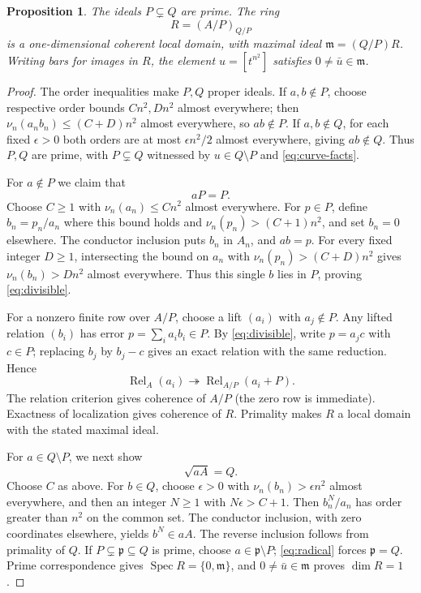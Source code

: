 \documentclass[11pt,reqno]{amsart}
\numberwithin{equation}{section}
\theoremstyle{plain}
\newtheorem{proposition}[theorem]{Proposition}
\DeclareMathOperator{\Spec}{Spec}
\newcommand{\mm}{\mathfrak m}
\begin{document}
\begin{proposition}\label{prop:ring}
The ideals $P\subsetneq Q$ are prime. The ring
\[
 R=(A/P)_{Q/P}
\]
is a one-dimensional coherent local domain, with maximal ideal
$\mm=(Q/P)R$. Writing bars for images in $R$, the element
$u=[t^{n^2}]$ satisfies $0\ne\bar u\in\mm$.
\end{proposition}
\begin{proof}
The order inequalities make $P,Q$ proper ideals. If $a,b\notin P$,
choose respective order bounds $Cn^2,Dn^2$ almost everywhere;
then $\nu_n(a_nb_n)\leq(C+D)n^2$ almost everywhere, so $ab\notin P$.
If $a,b\notin Q$, for each fixed $\epsilon>0$ both orders are at most
$\epsilon n^2/2$ almost everywhere, giving $ab\notin Q$.
Thus $P,Q$ are prime, with $P\subsetneq Q$ witnessed by
$u\in Q\setminus P$ and \eqref{eq:curve-facts}.

For $a\notin P$ we claim that
\begin{equation}\label{eq:divisible}
 aP=P.
\end{equation}
Choose $C\geq1$ with $\nu_n(a_n)\leq Cn^2$ almost everywhere.
For $p\in P$, define $b_n=p_n/a_n$ where this bound holds and
$\nu_n(p_n)>(C+1)n^2$, and set $b_n=0$ elsewhere.
The conductor inclusion puts $b_n$ in $A_n$, and $ab=p$.
For every fixed integer $D\geq1$, intersecting the bound on $a_n$
with $\nu_n(p_n)>(C+D)n^2$ gives $\nu_n(b_n)>Dn^2$ almost everywhere.
Thus this single $b$ lies in $P$, proving \eqref{eq:divisible}.

For a nonzero finite row over $A/P$, choose a lift $(a_i)$ with
$a_j\notin P$. Any lifted relation $(b_i)$ has error
$p=\sum_i a_i b_i\in P$. By \eqref{eq:divisible}, write $p=a_jc$
with $c\in P$; replacing $b_j$ by $b_j-c$ gives an exact relation
with the same reduction. Hence
\[
 \operatorname{Rel}_A(a_i)\twoheadrightarrow
 \operatorname{Rel}_{A/P}(a_i+P).
\]
The relation criterion gives coherence of $A/P$ (the zero row is
immediate). Exactness of localization gives coherence of $R$.
Primality makes $R$ a local domain with the stated maximal ideal.

For $a\in Q\setminus P$, we next show
\begin{equation}\label{eq:radical}
 \sqrt{aA}=Q.
\end{equation}
Choose $C$ as above. For $b\in Q$, choose $\epsilon>0$ with
$\nu_n(b_n)>\epsilon n^2$ almost everywhere, and then an integer
$N\geq1$ with $N\epsilon>C+1$.
Then $b_n^N/a_n$ has order greater than $n^2$ on the common set.
The conductor inclusion, with zero coordinates elsewhere, yields
$b^N\in aA$. The reverse inclusion follows from primality of $Q$.
If $P\subsetneq\mathfrak p\subseteq Q$ is prime, choose
$a\in\mathfrak p\setminus P$; \eqref{eq:radical} forces
$\mathfrak p=Q$. Prime correspondence gives
$\Spec R=\{0,\mm\}$, and $0\ne\bar u\in\mm$ proves $\dim R=1$.
\end{proof}
\end{document}
